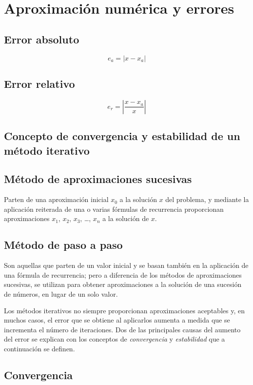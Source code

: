 \documentclass{memoir}
\begin{document}
\chapter{Aproximación numérica y errores}


\section{Error absoluto}

\[ e_a=|x-x_a| \]

\section{Error relativo}

\[e_r=|\frac{x-x_a}{x}| \]

\section{Concepto de convergencia y estabilidad de un método iterativo}

\section{Método de aproximaciones sucesivas}

Parten de una aproximación inicial $x_0$ a la solución $x$ del problema, y mediante la aplicación reiterada de una o varias fórmulas de recurrencia proporcionan aproximaciones $x_1$, $x_2$, $x_3$, \ldots , $x_n$ a la solución de $x$.


\section{Método de paso a paso}

Son aquellas que parten de un valor inicial y se basan también en la aplicación de una fórmula de recurrencia; pero a diferencia de los métodos de aproximaciones sucesivas, se utilizan para obtener aproximaciones a la solución de una sucesión de números, en lugar de un solo valor.


Los métodos iterativos no siempre proporcionan aproximaciones aceptables y, en muchos casos, el error que se obtiene al aplicarlos aumenta a medida que se incrementa el número de iteraciones. Dos de las principales causas del aumento del error se explican con los conceptos de \textit{convergencia} y \textit{estabilidad} que a continuación se definen.


\section{Convergencia}
\end{document}
